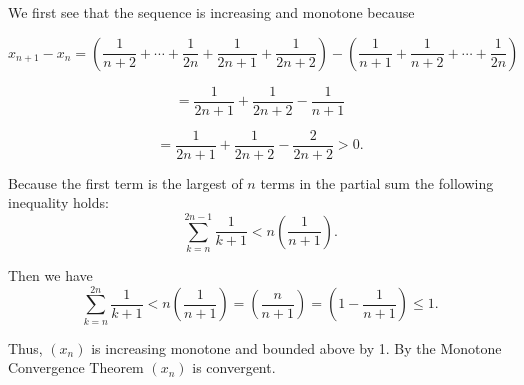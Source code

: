 \documentclass{report}
\begin{document}
\begin{myproof}

We first see that the sequence is increasing and monotone because 

$$x_{n+1} - x_{n}= 
\left(\frac{1}{n+2}+\cdots+\frac{1}{2 n} + \frac{1}{2n+1} + \frac{1}{2n+2} \right) - \left(\frac{1}{n+1}+\frac{1}{n+2}+\cdots+\frac{1}{2 n}\right)$$  

$$ =  \frac{1}{2n+1} + \frac{1}{2n+2} - \frac{1}{n+1}$$

$$ =  \frac{1}{2n+1} + \frac{1}{2n+2} - \frac{2}{2n+2} > 0.$$



Because the first term is the largest of $n$ terms in the partial sum   the following inequality holds:
$$ \sum_{k =n}^{2n-1} \frac{1}{k+1} < n\left(\frac{1}{n+1}\right).$$

Then we have
$$ \sum_{k =n}^{2n} \frac{1}{k+1} < n\left(\frac{1}{n+1}\right) = \left(\frac{n}{n+1}\right) =\left(1 - \frac{1}{n + 1}\right) \leq 1.$$

Thus, $(x_n)$ is increasing monotone and bounded above by 1. By the Monotone Convergence Theorem $(x_n)$ is convergent.

\end{myproof}



\pagebreak
{}
\end{document}
